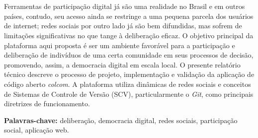\section*{}




\noindent Ferramentas de participação digital já são uma realidade no Brasil e em outros países, contudo, seu acesso ainda se restringe a uma pequena parcela dos usuários de internet; redes sociais por outro lado já são bem difundidas, mas sofrem de limitações significativas no que tange à deliberação eficaz. O objetivo principal da plataforma aqui proposta é ser um ambiente favorável para a participação e deliberação de indivíduos de uma certa comunidade em seus processos de decisão, promovendo, assim, a democracia digital em escala local. O presente relatório técnico descreve o processo de projeto, implementação e validação da aplicação de código aberto \textit{colcom}. A plataforma utiliza dinâmicas de redes sociais e conceitos de Sistemas de Controle de Versão (SCV), particularmente o \textit{Git}, como principais diretrizes de funcionamento.

{\bf Palavras-chave:} deliberação, democracia digital,  redes sociais, participação social, aplicação web.


